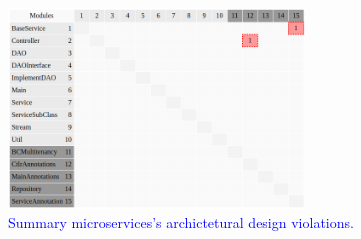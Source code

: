 \documentclass[12pt]{article}
\begin{document}
\begin{figure}[ht]
\centering
\includegraphics[width=0.7\textwidth]{figuras/violacoesSummary.png}
\caption{\textcolor{blue}{Summary microservices's archictetural design violations.}}
\label{fig:microservices}
\end{figure}
% 
\end{document}

